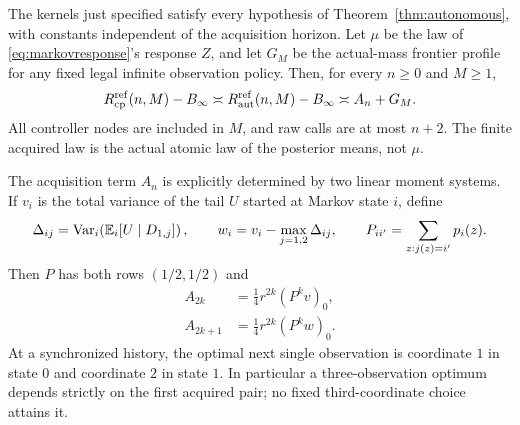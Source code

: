 \begin{theorem}\label{thm:markovadaptive}
The kernels just specified satisfy every hypothesis of Theorem~\ref{thm:autonomous}, with constants independent of the acquisition horizon. Let $\mu$ be the law of \eqref{eq:markovresponse}'s response $Z$, and let $G_M$ be the actual-mass frontier profile for any fixed legal infinite observation policy. Then, for every $n\ge0$ and $M\ge1$,
\begin{equation}\label{eq:markovresourcelaw}
 R_{\rm cp}^{\rm ref}(n,M)-B_\infty
 \asymp R_{\rm aut}^{\rm ref}(n,M)-B_\infty
 \asymp A_n+G_M.
\end{equation}
All controller nodes are included in $M$, and raw calls are at most $n+2$. The finite acquired law is the actual atomic law of the posterior means, not $\mu$.

The acquisition term $A_n$ is explicitly determined by two linear moment systems. If $v_i$ is the total variance of the tail $U$ started at Markov state $i$, define
\[
 \Delta_{ij}=\operatorname{Var}_i\!\left(\mathbb E_i[U\mid D_{1,j}]\right),
 \qquad w_i=v_i-\max_{j=1,2}\Delta_{ij},
 \qquad P_{ii'}=\sum_{z:j(z)=i'}p_i(z).
\]
Then $P$ has both rows $(1/2,1/2)$ and
\begin{align}
 A_{2k}&=\tfrac14 r^{2k}(P^kv)_0,\label{eq:markoveven}\\
 A_{2k+1}&=\tfrac14 r^{2k}(P^kw)_0.\label{eq:markovodd}
\end{align}
At a synchronized history, the optimal next single observation is coordinate $1$ in state $0$ and coordinate $2$ in state $1$. In particular a three-observation optimum depends strictly on the first acquired pair; no fixed third-coordinate choice attains it.
\end{theorem}
